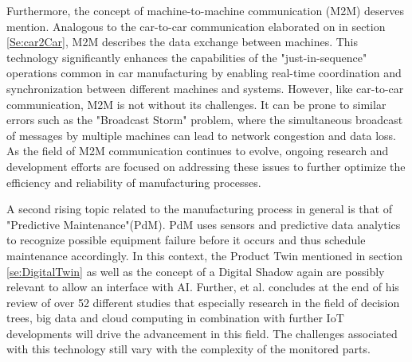 Furthermore, the concept of machine-to-machine communication (M2M) deserves mention. \cite{gundougan2021impact} Analogous to the car-to-car communication elaborated on in section \ref{Se:car2Car}, M2M describes the data exchange between machines. This technology significantly enhances the capabilities of the "just-in-sequence" operations common in car manufacturing by enabling real-time coordination and synchronization between different machines and systems. However, like car-to-car communication, M2M is not without its challenges. It can be prone to similar errors such as the "Broadcast Storm" problem, where the simultaneous broadcast of messages by multiple machines can lead to network congestion and data loss. As the field of M2M communication continues to evolve, ongoing research and development efforts are focused on addressing these issues to further optimize the efficiency and reliability of manufacturing processes.

A second rising topic related to the manufacturing process in general is that of "Predictive Maintenance"(PdM). PdM uses sensors and predictive data analytics to recognize possible equipment failure before it occurs and thus schedule maintenance accordingly. \cite{cinar2022predictive} In this context, the Product Twin mentioned in section \ref{se:DigitalTwin} as well as the concept of a Digital Shadow again are possibly relevant to allow an interface with AI. Further, et al. \cite{ersoz2022systematic} concludes at the end of his review of over 52 different studies that especially research in the field of decision trees, big data and cloud computing in combination with further IoT developments will drive the advancement in this field. The challenges associated with this technology still vary with the complexity of the monitored parts.
